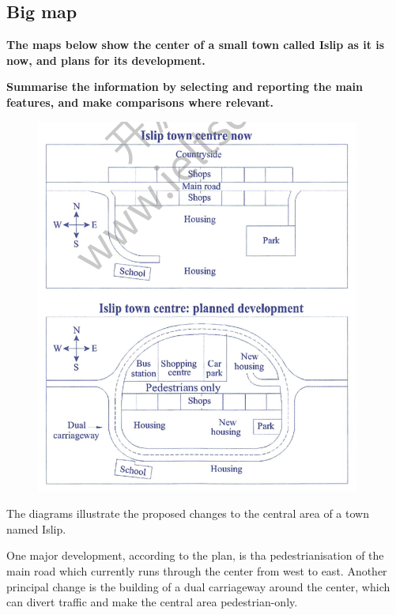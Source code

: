 \documentclass[conference]{IEEEtran}
\begin{document}
\subsection{Big map}

\textbf{The maps below show the center of a small town called Islip as it is now,
and plans for its development.}

\textbf{Summarise the information by selecting and reporting the main features, and make comparisons
where relevant.}

\begin{figure}[htbp]
    \centerline{\includegraphics[width=1.0\columnwidth]{images/Screenshot from 2022-12-05 12-40-59.png}}
\end{figure}

The diagrams illustrate the proposed changes to the central area of a town named Islip.

One major development, according to the plan, is tha pedestrianisation of the main road which currently runs through the center from west to east.
Another principal change is the building of a dual carriageway around the center,
which can divert traffic and make the central area pedestrian-only.
\end{document}
